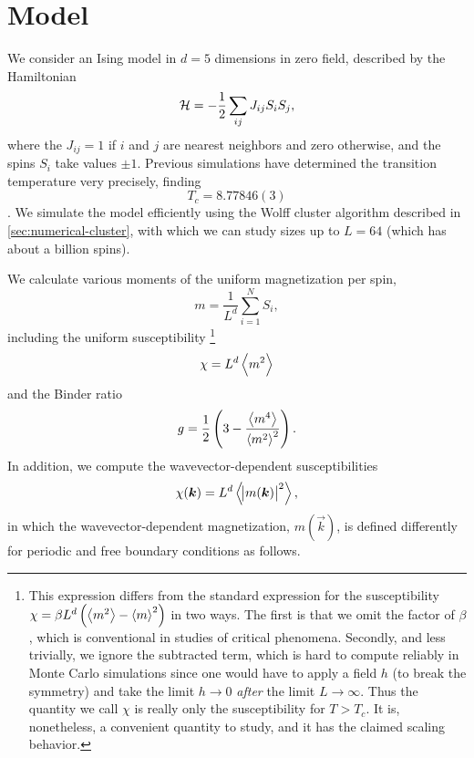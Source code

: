 
\section{Model}
\label{sec:fss-model}

We consider an Ising model in $d=5$ dimensions in zero field, described by the
Hamiltonian
\begin{equation}
  \mathcal{H} = -\frac{1}{2} \sum_{ij} J_{ij} S_i S_j,
\end{equation}
where the $J_{ij}=1$ if $i$ and $j$ are nearest neighbors and zero otherwise,
and the spins $S_i$ take values $\pm 1$. Previous simulations have determined
the transition temperature very precisely, finding
\begin{equation}
  T_c = 8.77846(3)
  \label{eq:Tc-d5}
\end{equation}
\autocite{luijten1999finite}. We simulate the model efficiently using the Wolff
cluster algorithm described in \cref{sec:numerical-cluster}, with which we can
study sizes up to $L=64$ (which has about a billion spins).

We calculate various moments of the uniform magnetization per spin,
\begin{equation}
  m = \frac{1}{L^d} \sum_{i=1}^N S_i,
  \label{eq:mag-k0}
\end{equation}
including the uniform susceptibility%
\footnote{%
  This expression differs from the standard expression for the susceptibility
  $\chi=\beta L^d \left(\left< m^2 \right>-\left< m \right>^2\right)$ in two ways. The first is that we
  omit the factor of $\beta$, which is conventional in studies of critical
  phenomena. Secondly, and less trivially, we ignore the subtracted term, which
  is hard to compute reliably in Monte Carlo simulations since one would have
  to apply a field $h$ (to break the symmetry) and take the limit $h \to 0$
  \emph{after} the limit $L\to\infty$. Thus the quantity we call $\chi$ is
  really only the susceptibility for $T>T_c$. It is, nonetheless, a convenient
  quantity to study, and it has the claimed scaling behavior.
}
\begin{equation}
  \chi = L^d \left< m^2 \right>
  \label{eq:susc-k0}
\end{equation}
and the Binder ratio
\begin{equation}
  g = \frac{1}{2}\left(3 - \frac{\left< m^4 \right>}{\left< m^2 \right>^2}\right).
  \label{eq:binder}
\end{equation}
In addition, we compute the wavevector-dependent susceptibilities
\begin{equation}
  \chi(\bm{k}) = L^d \left< \abs{m(\bm{k})}^2 \right>,
\end{equation}
in which the wavevector-dependent magnetization, $m(\vec{k})$, is defined
differently for periodic and free boundary conditions as follows.

